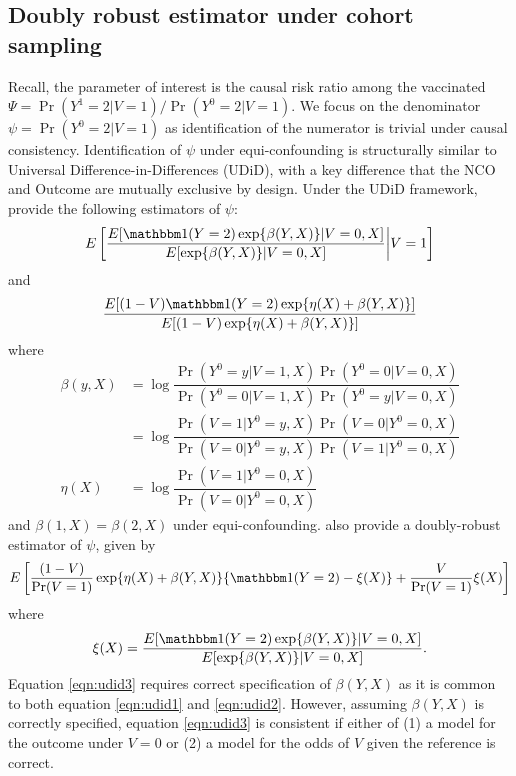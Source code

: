 \begin{appendix}
\begin{refsection}
     \section{Doubly robust estimator under cohort sampling}\label{sec:eif_cohort}

Recall, the parameter of interest is the causal risk ratio among the vaccinated $\Psi = \Pr(Y^1=2|V=1)/\Pr(Y^0 = 2 | V = 1)$. We focus on the denominator $\psi = \Pr(Y^0 = 2 | V = 1)$ as identification of the numerator is trivial under causal consistency. Identification of $\psi$ under equi-confounding is structurally similar to Universal Difference-in-Differences (UDiD), with a key difference that the NCO and Outcome are mutually exclusive by design. Under the UDiD framework, \textcite{tchetgen_universal_2023} provide the following estimators of $\psi$:
\begin{equation} \label{eqn:udid1}
    E\left[\dfrac{E[\mathbbm 1(Y=2)\exp\{\beta(Y,X)\} | V = 0, X]}{E[\exp\{\beta(Y,X)\} | V = 0, X]}\bigg|V = 1\right]
\end{equation}
and 
\begin{equation}\label{eqn:udid2}
    \dfrac{E[(1-V)\mathbbm 1(Y=2)\exp\{\eta(X) + \beta(Y,X)\}]}{E[(1-V)\exp\{\eta(X) +\beta(Y,X)\}]}
\end{equation}
where
\begin{align*}
    \beta(y,X) &= \log\dfrac{\Pr(Y^0=y|V=1,X)\Pr(Y^0=0|V=0,X)}{\Pr(Y^0=0|V=1,X)\Pr(Y^0=y|V=0, X)} \\
    &= \log\dfrac{\Pr(V=1 | Y^0=y,X)\Pr(V=0|Y^0=0,X)}{\Pr(V=0|Y^0=y, X)\Pr(V=1|Y^0=0,X)} \\
    \eta(X) &= \log \dfrac{\Pr(V = 1 | Y^0 = 0, X)}{\Pr(V = 0 | Y^0 = 0, X)}
\end{align*}
and $\beta(1,X) = \beta(2,X)$ under equi-confounding. \textcite{tchetgen_universal_2023} also provide a doubly-robust estimator of $\psi$, given by 
\begin{equation}\label{eqn:udid3}
     E\left[\dfrac{(1 - V)}{\Pr(V=1)} \exp\{\eta(X) + \beta(Y,X)\}\{\mathbbm 1(Y = 2) - \xi(X)\} + \dfrac{V}{\Pr(V=1)}\xi(X)  \right]
\end{equation}
where 
\[\xi(X) = \dfrac{E[\mathbbm 1(Y=2)\exp\{\beta(Y,X)\} | V = 0, X]}{E[\exp\{\beta(Y,X)\} | V = 0, X]}.\]
Equation \ref{eqn:udid3} requires correct specification of $\beta(Y, X)$ as it is common to both equation \ref{eqn:udid1} and  \ref{eqn:udid2}.  However, assuming $\beta(Y,X)$ is correctly specified, equation \ref{eqn:udid3} is consistent if either of (1) a model for the outcome under $V=0$ or (2) a model for the odds of $V$ given the reference is correct. 



\end{refsection}
\end{appendix}
